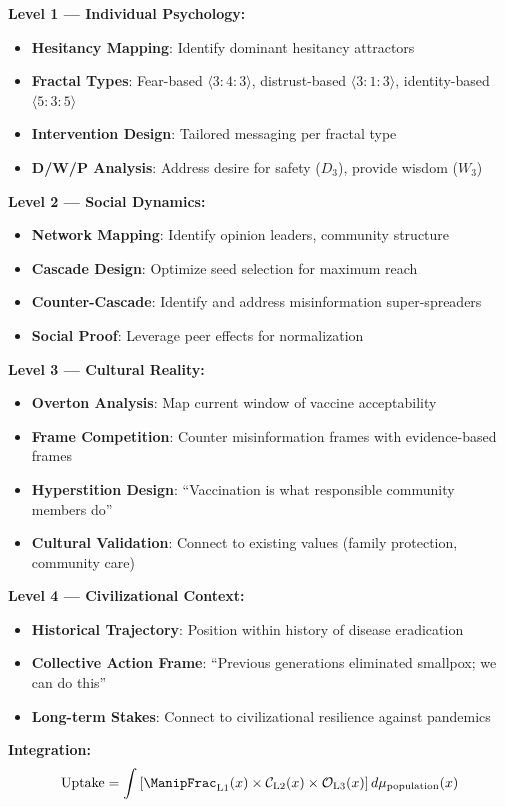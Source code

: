 \documentclass[11pt,twoside]{book}
\newcommand{\Overton}{\mathcal{O}}
\newcommand{\Cascade}{\mathcal{C}}
\begin{document}
\begin{tcolorbox}[colback=green!5!white,colframe=green!65!black,title=\textbf{Public Health Stack Deployment},breakable]

\textbf{Level 1 --- Individual Psychology:}
\begin{itemize}
    \item \textbf{Hesitancy Mapping}: Identify dominant hesitancy attractors
    \item \textbf{Fractal Types}: Fear-based $\langle 3:4:3 \rangle$, distrust-based $\langle 3:1:3 \rangle$,
          identity-based $\langle 5:3:5 \rangle$
    \item \textbf{Intervention Design}: Tailored messaging per fractal type
    \item \textbf{D/W/P Analysis}: Address desire for safety ($D_3$), provide wisdom ($W_3$)
\end{itemize}

\textbf{Level 2 --- Social Dynamics:}
\begin{itemize}
    \item \textbf{Network Mapping}: Identify opinion leaders, community structure
    \item \textbf{Cascade Design}: Optimize seed selection for maximum reach
    \item \textbf{Counter-Cascade}: Identify and address misinformation super-spreaders
    \item \textbf{Social Proof}: Leverage peer effects for normalization
\end{itemize}

\textbf{Level 3 --- Cultural Reality:}
\begin{itemize}
    \item \textbf{Overton Analysis}: Map current window of vaccine acceptability
    \item \textbf{Frame Competition}: Counter misinformation frames with evidence-based frames
    \item \textbf{Hyperstition Design}: ``Vaccination is what responsible community members do''
    \item \textbf{Cultural Validation}: Connect to existing values (family protection, community care)
\end{itemize}

\textbf{Level 4 --- Civilizational Context:}
\begin{itemize}
    \item \textbf{Historical Trajectory}: Position within history of disease eradication
    \item \textbf{Collective Action Frame}: ``Previous generations eliminated smallpox; we can do this''
    \item \textbf{Long-term Stakes}: Connect to civilizational resilience against pandemics
\end{itemize}

\textbf{Integration:}
\begin{equation}
    \mathrm{Uptake} = \int \left[ \ManipFrac_{\mathrm{L1}}(x) \times \Cascade_{\mathrm{L2}}(x) \times
    \Overton_{\mathrm{L3}}(x) \right] d\mu_{\mathrm{population}}(x)
\end{equation}

\end{tcolorbox}
\end{document}
